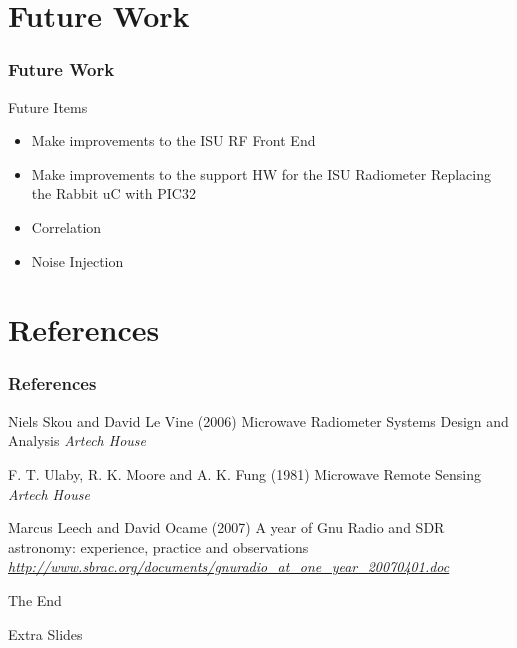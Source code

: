 \documentclass{beamer}
\begin{document}
\section{Future Work}
\begin{frame}
\frametitle{Future Work}
\begin{block}{Future Items}
\begin{itemize}
\item Make improvements to the ISU RF Front End
\item Make improvements to the support HW for the ISU Radiometer
\note Replacing the Rabbit uC with PIC32
\item Correlation
\item Noise Injection
\end{itemize}
\end{block}
\end{frame}

\section{References}
\begin{frame}
\frametitle{References}
\footnotesize{
\begin{thebibliography}{99}
 Niels Skou and David Le Vine (2006)
\newblock Microwave Radiometer Systems Design and Analysis
\newblock \emph{Artech House}

 F. T. Ulaby, R. K. Moore and A. K. Fung (1981)
\newblock Microwave Remote Sensing
\newblock \emph{Artech House}

 Marcus Leech and David Ocame (2007)
\newblock A year of Gnu Radio and SDR astronomy: experience, practice and observations
\newblock \emph{\url{http://www.sbrac.org/documents/gnuradio_at_one_year_20070401.doc}}

\end{thebibliography}
}
\end{frame}

\begin{frame}
\Huge{\centerline{The End}}
\end{frame}

\begin{frame}
\Huge{\centerline{Extra Slides}}
\end{frame}
\end{document}
